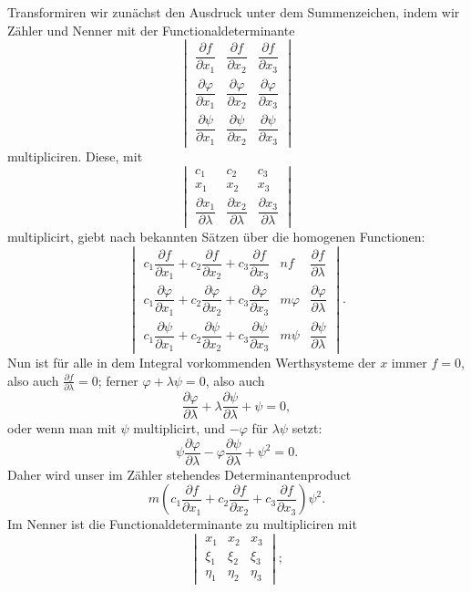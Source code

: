 \documentclass[10pt]{article}
\begin{document}
Transformiren wir zunächst den Ausdruck unter dem Summenzeichen, indem wir Zähler und Nenner mit der Functionaldeterminante
\[
\begin{vmatrix}
\dfrac{\partial f}{\partial x_1}&\dfrac{\partial f}{\partial x_2}&\dfrac{\partial f}{\partial x_3}\\
\dfrac{\partial\varphi}{\partial x_1}&\dfrac{\partial\varphi}{\partial x_2}&\dfrac{\partial\varphi}{\partial x_3}\\
\dfrac{\partial\psi}{\partial x_1}&\dfrac{\partial\psi}{\partial x_2}&\dfrac{\partial\psi}{\partial x_3}
\end{vmatrix}
\]
multipliciren. Diese, mit
\[
\begin{vmatrix}
c_1&c_2&c_3\\
x_1&x_2&x_3\\
\dfrac{\partial x_1}{\partial\lambda}&\dfrac{\partial x_2}{\partial\lambda}&\dfrac{\partial x_3}{\partial\lambda}
\end{vmatrix}
\]
multiplicirt, giebt nach bekannten Sätzen über die homogenen Functionen:
\[
\begin{vmatrix}
c_1\dfrac{\partial f}{\partial x_1}+c_2\dfrac{\partial f}{\partial x_2}+c_3\dfrac{\partial f}{\partial x_3} & nf & \dfrac{\partial f}{\partial\lambda}\\
c_1\dfrac{\partial\varphi}{\partial x_1}+c_2\dfrac{\partial\varphi}{\partial x_2}+c_3\dfrac{\partial\varphi}{\partial x_3} & m\varphi & \dfrac{\partial\varphi}{\partial\lambda}\\
c_1\dfrac{\partial\psi}{\partial x_1}+c_2\dfrac{\partial\psi}{\partial x_2}+c_3\dfrac{\partial\psi}{\partial x_3} & m\psi & \dfrac{\partial\psi}{\partial\lambda}
\end{vmatrix}.
\]
Nun ist für alle in dem Integral vorkommenden Werthsysteme der $x$ immer $f=0$, also auch $\frac{\partial f}{\partial\lambda}=0$; ferner $\varphi+\lambda\psi=0$, also auch
\[
\frac{\partial\varphi}{\partial\lambda}+\lambda\frac{\partial\psi}{\partial\lambda}+\psi=0,
\]
oder wenn man mit $\psi$ multiplicirt, und $-\varphi$ für $\lambda\psi$ setzt:
\[
\psi\frac{\partial\varphi}{\partial\lambda}-\varphi\frac{\partial\psi}{\partial\lambda}+\psi^2=0.
\]
Daher wird unser im Zähler stehendes Determinantenproduct
\[
m\left(c_1\frac{\partial f}{\partial x_1}+c_2\frac{\partial f}{\partial x_2}+c_3\frac{\partial f}{\partial x_3}\right)\psi^2.
\]
Im Nenner ist die Functionaldeterminante zu multipliciren mit
\[
\begin{vmatrix}
x_1&x_2&x_3\\
\xi_1&\xi_2&\xi_3\\
\eta_1&\eta_2&\eta_3
\end{vmatrix};
\]
\end{document}
